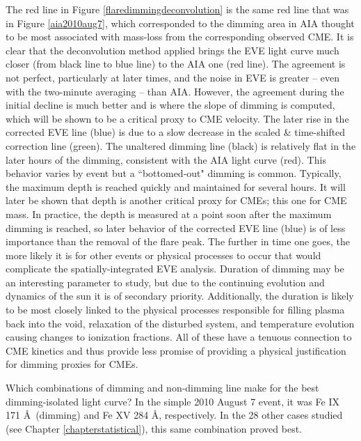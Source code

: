 The red line in Figure \ref{flaredimmingdeconvolution} is the same red line that was in Figure \ref{aia2010aug7}, which corresponded to the dimming area in AIA thought to be most associated with mass-loss from the corresponding observed CME. It is clear that the deconvolution method applied brings the EVE light curve much closer (from black line to blue line) to the AIA one (red line). The agreement is not perfect, particularly at later times, and the noise in EVE is greater -- even with the two-minute averaging -- than AIA. However, the agreement during the initial decline is much better and is where the slope of dimming is computed, which will be shown to be a critical proxy to CME velocity. The later rise in the corrected EVE line (blue) is due to a slow decrease in the scaled \& time-shifted correction line (green). The unaltered dimming line (black) is relatively flat in the later hours of the dimming, consistent with the AIA light curve (red). This behavior varies by event but a ``bottomed-out" dimming is common. Typically, the maximum depth is reached quickly and maintained for several hours. It will later be shown that depth is another critical proxy for CMEs; this one for CME mass. In practice, the depth is measured at a point soon after the maximum dimming is reached, so later behavior of the corrected EVE line (blue) is of less importance than the removal of the flare peak. The further in time one goes, the more likely it is for other events or physical processes to occur that would complicate the spatially-integrated EVE analysis. Duration of dimming may be an interesting parameter to study, but due to the continuing evolution and dynamics of the sun it is of secondary priority. Additionally, the duration is likely to be most closely linked to the physical processes responsible for filling plasma back into the void, relaxation of the disturbed system, and temperature evolution causing changes to ionization fractions. All of these have a tenuous connection to CME kinetics and thus provide less promise of providing a physical justification for dimming proxies for CMEs. 

Which combinations of dimming and non-dimming line make for the best dimming-isolated light curve? In the simple 2010 August 7 event, it was Fe IX 171 \AA\ (dimming) and Fe XV 284 \AA, respectively. In the 28 other cases studied (see Chapter \ref{chapterstatistical}), this same combination proved best. 

